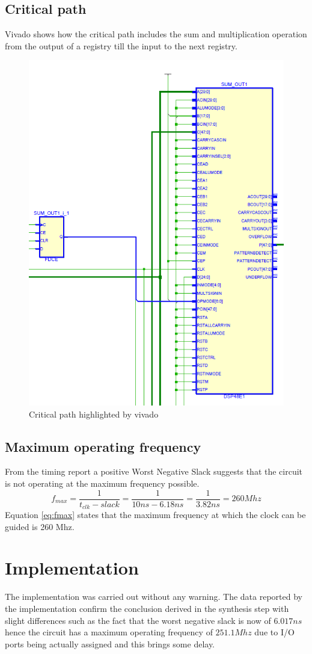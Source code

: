 \subsection{Critical path} %
\label{sub:critical_path}
Vivado shows how the critical path includes the sum and multiplication operation from the output of a registry till the input to the next registry.
 \begin{figure}[H]
   \centering
   \includegraphics[width=0.5\linewidth]{./images/critical}
   \caption{Critical path highlighted by vivado}
   \label{fig:critical}
 \end{figure}
\subsection{Maximum operating frequency} %
\label{sub:maximum_operating_frequency}
From the timing report a positive Worst Negative Slack suggests that the circuit is not operating at the maximum frequency possible.
\begin{equation}
	\label{eq:fmax}
	f_{max} = \frac{1}{t_{clk}-slack}=\frac{1}{10ns-6.18ns}= \frac{1}{3.82ns}= 260 Mhz
\end{equation}
Equation \ref{eq:fmax} states that the maximum frequency at which the clock can be guided is 260 Mhz.

\section{Implementation}
The implementation was carried out without any warning. The data reported by the implementation confirm the conclusion derived in the synthesis step with slight differences such as the fact that the worst negative slack is now of $6.017ns$ hence the circuit has a maximum operating frequency of $251.1Mhz$ due to I/O ports being actually assigned and this brings some delay. 
